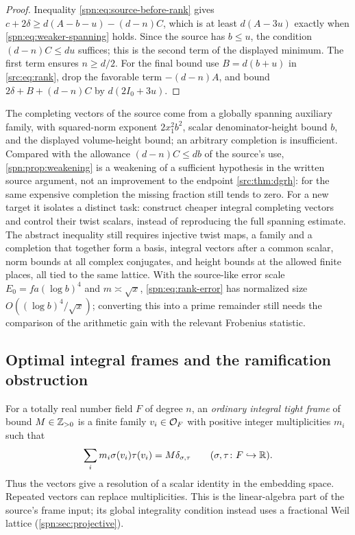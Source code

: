\begin{proof}
Inequality \eqref{spn:eq:source-before-rank} gives
$c+2\delta\ge d(A-b-u)-(d-n)C$, which is at least $d(A-3u)$ exactly when
\eqref{spn:eq:weaker-spanning} holds. Since the source has $b\le u$, the
condition $(d-n)C\le du$ suffices; this is the second term of the displayed
minimum. The first term ensures $n\ge d/2$. For the final bound use
$B=d(b+u)$ in \eqref{src:eq:rank}, drop the favorable term $-(d-n)A$, and
bound $2\delta+B+(d-n)C$ by $d(2I_0+3u)$.
\end{proof}

The completing vectors of the source come from a globally spanning auxiliary
family, with squared-norm exponent $2x_1^2b^2$, scalar denominator-height
bound $b$, and the displayed volume-height bound; an arbitrary completion is
insufficient. Compared with the allowance $(d-n)C\le db$ of the source's use,
\cref{spn:prop:weakening} is a weakening of a sufficient hypothesis in the
written source argument, not an improvement to the endpoint
\cref{src:thm:dgrh}: for the same expensive completion the missing fraction
still tends to zero. For a new target it isolates a distinct task: construct
cheaper integral completing vectors and control their twist scalars, instead
of reproducing the full spanning estimate. The abstract inequality still
requires injective twist maps, a family and a completion that together form a
basis, integral vectors after a common scalar, norm bounds at all complex
conjugates, and height bounds at the allowed finite places, all tied to the
same lattice. With the source-like error scale $E_0=fa(\log b)^4$ and
$m\asymp\sqrt x$, \eqref{spn:eq:rank-error} has normalized size
$O((\log b)^4/\sqrt x)$; converting this into a prime remainder still needs
the comparison of the arithmetic gain with the relevant Frobenius statistic.

\subsection{Optimal integral frames and the ramification obstruction}\label{spn:sec:frames}

For a totally real number field $F$ of degree $n$, an \emph{ordinary integral
tight frame} of bound $M\in\mathbb{Z}_{>0}$ is a finite family $v_i\in\mathcal{O}_F$ with
positive integer multiplicities $m_i$ such that
\begin{equation}\label{spn:eq:frame}
 \sum_im_i\sigma(v_i)\tau(v_i)=M\delta_{\sigma,\tau}
 \qquad(\sigma,\tau\colon F\hookrightarrow\mathbb{R}).
\end{equation}
Thus the vectors give a resolution of a scalar identity in the embedding
space. Repeated vectors can replace multiplicities. This is the linear-algebra
part of the source's frame input; its global integrality condition instead
uses a fractional Weil lattice (\cref{spn:sec:projective}).

